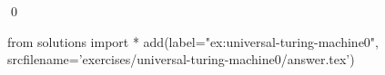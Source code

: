 
\begin{ex} 
  \label{ex:universal-turing-machine0}
  
  \qed
\end{ex} 
\begin{python0}
from solutions import *
add(label="ex:universal-turing-machine0",
    srcfilename='exercises/universal-turing-machine0/answer.tex') 
\end{python0}
